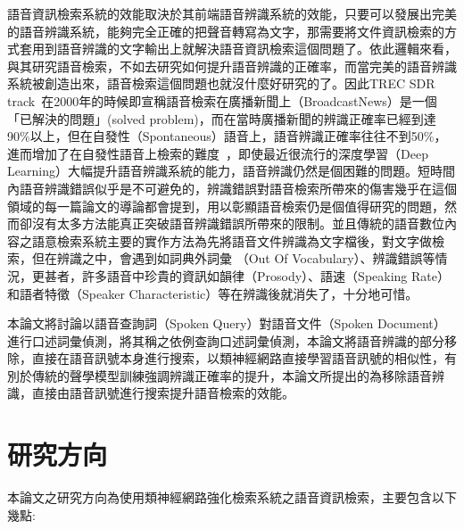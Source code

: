 語音資訊檢索系統的效能取決於其前端語音辨識系統的效能，只要可以發展出完美的語音辨識系統，能夠完全正確的把聲音轉寫為文字，那需要將文件資訊檢索的方式套用到語音辨識的文字輸出上就解決語音資訊檢索這個問題了。依此邏輯來看，與其研究語音檢索，不如去研究如何提升語音辨識的正確率，而當完美的語音辨識系統被創造出來，語音檢索這個問題也就沒什麼好研究的了。因此TREC SDR track~\cite{trec}在2000年的時候即宣稱語音檢索在廣播新聞上（BroadcastNews）是一個「已解決的問題」(solved
problem)，而在當時廣播新聞的辨識正確率已經到達90\%以上，但在自發性（Spontaneous）語音上，語音辨識正確率往往不到50\%，進而增加了在自發性語音上檢索的難度~\cite{saraclar2004lattice,mamou2006spoken}，即使最近很流行的深度學習（Deep
Learning）大幅提升語音辨識系統的能力，語音辨識仍然是個困難的問題。短時間內語音辨識錯誤似乎是不可避免的，辨識錯誤對語音檢索所帶來的傷害幾乎在這個領域的每一篇論文的導論都會提到，用以彰顯語音檢索仍是個值得研究的問題，然而卻沒有太多方法能真正突破語音辨識錯誤所帶來的限制。並且傳統的語音數位內容之語意檢索系統主要的實作方法為先將語音文件辨識為文字檔後，對文字做檢索，但在辨識之中，會遇到如詞典外詞彙
（Out Of Vocabulary）、辨識錯誤等情況，更甚者，許多語音中珍貴的資訊如韻律（Prosody）、語速（Speaking Rate）和語者特徵（Speaker Characteristic）等在辨識後就消失了，十分地可惜。

本論文將討論以語音查詢詞（Spoken Query）對語音文件（Spoken
Document）進行口述詞彙偵測，將其稱之依例查詢口述詞彙偵測，本論文將語音辨識的部分移除，直接在語音訊號本身進行搜索，以類神經網路直接學習語音訊號的相似性，有別於傳統的聲學模型訓練強調辨識正確率的提升，本論文所提出的為移除語音辨識，直接由語音訊號進行搜索提升語音檢索的效能。

\section{研究方向}
本論文之研究方向為使用類神經網路強化檢索系統之語音資訊檢索，主要包含以下幾點:

